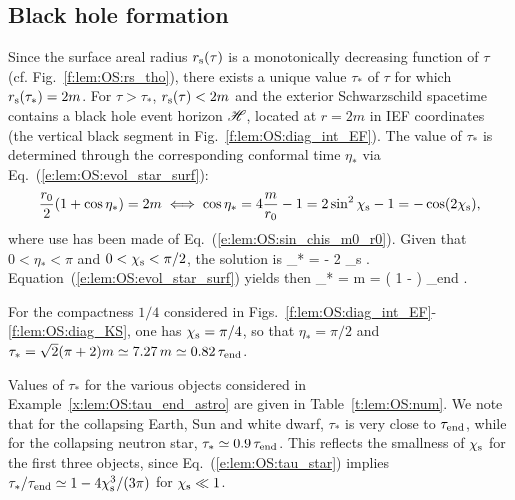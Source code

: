 \subsection{Black hole formation}

Since the surface areal radius $r_{\rm s}(\tau)$ is a monotonically decreasing function
of $\tau$ (cf. Fig.~\ref{f:lem:OS:rs_tho}), there exists a unique value $\tau_*$ of
$\tau$ for which $r_{\rm s}(\tau_*) = 2 m$. For $\tau>\tau_*$, $r_{\rm s}(\tau) < 2 m$
and the exterior
Schwarzschild spacetime contains a black hole event horizon $\mathscr{H}$, located
at $r=2m$ in IEF coordinates (the vertical black segment in Fig.~\ref{f:lem:OS:diag_int_EF}).
The value of $\tau_*$ is determined through the corresponding
conformal time $\eta_*$ via Eq.~(\ref{e:lem:OS:evol_star_surf}):
\[
    \frac{r_0}{2} (1 + \cos\eta_*) = 2 m \iff
    \cos\eta_* = 4\frac{m}{r_0} - 1 = 2 \sin^2\chi_{\rm s} - 1 = - \cos(2\chi_{\rm s}) ,
\]
where use has been made of Eq.~(\ref{e:lem:OS:sin_chis_m0_r0}). Given that $0<\eta_*<\pi$
and $0<\chi_{\rm s} < \pi/2$, the solution is
\be \label{e:lem:OS:eta_star}
    \eta_* = \pi - 2 \chi_{\rm s} .
\ee
Equation~(\ref{e:lem:OS:evol_star_surf}) yields then
\be \label{e:lem:OS:tau_star}
    \tau_* =  m
     =  \left( 1 -  \right) \tau_{\rm end} .
\ee

\begin{example} \label{x:lem:OS:tau_star_chis4}
For the compactness $1/4$ considered in
Figs.~\ref{f:lem:OS:diag_int_EF}-\ref{f:lem:OS:diag_KS}, one has $\chi_{\rm s}=\pi/4$,
so that $\eta_* = \pi/2$ and
$\tau_* = \sqrt{2}(\pi + 2) m \simeq 7.27 \, m \simeq 0.82 \, \tau_{\rm end}$.
\end{example}

\begin{example} \label{x:lem:OS:tau_star_astro}
Values of $\tau_*$ for the various objects considered in Example~\ref{x:lem:OS:tau_end_astro}
are given in Table~\ref{t:lem:OS:num}. We note that for the collapsing Earth, Sun and white dwarf,
$\tau_*$ is very close to $\tau_{\rm end}$, while for the collapsing neutron star,
$\tau_* \simeq 0.9 \, \tau_{\rm end}$. This reflects the smallness of $\chi_{\rm s}$ for
the first three objects, since Eq.~(\ref{e:lem:OS:tau_star}) implies
$\tau_*/\tau_{\rm end} \simeq 1 - 4 \chi_{\rm s}^3/(3\pi)$ for $\chi_{\rm s} \ll 1$.
\end{example}


